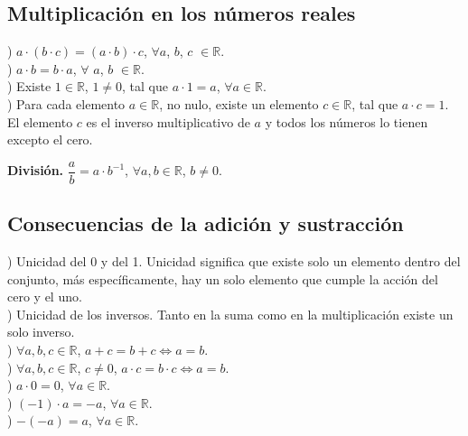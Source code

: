 \subsection{Multiplicación en los números reales}
) $a\cdot(b\cdot c)=(a\cdot b)\cdot c$, $\forall a$, $b$, $c$ $\in \mathbb{R}$.\\

) $a\cdot b=b\cdot a$, $\forall$ $a$, $b$ $\in\mathbb{R}$.\\

) Existe $1\in\mathbb{R}$, $1\neq 0$, tal que $a\cdot 1=a$, $\forall a\in\mathbb{R}$.\\

) Para cada elemento $a\in\mathbb{R}$, no nulo, existe un elemento $c\in\mathbb{R}$, tal que $a\cdot c=1$. El elemento $c$ es el inverso multiplicativo de $a$ y todos los números lo tienen excepto el cero.\\

\begin{mydef}
\textbf{División.} $\dfrac{a}{b}=a\cdot b^{-1}$, $\forall a,b\in\mathbb{R}$, $b\neq 0$.
\end{mydef}

\subsection{Consecuencias de la adición y sustracción}
\label{consecu}
) Unicidad del 0 y del 1. Unicidad significa que existe solo un elemento dentro del conjunto, más específicamente, hay un solo elemento que cumple la acción del cero y el uno. \\

) Unicidad de los inversos. Tanto en la suma como en la multiplicación existe un solo inverso.\\

) $\forall a,b,c\in\mathbb{R}$, $a+c=b+c\Leftrightarrow a=b$. \\

) $\forall a,b,c\in\mathbb{R}$, $c\neq 0$, $a\cdot c=b\cdot c\Leftrightarrow a=b$. \\

) $a\cdot 0=0$, $\forall a\in\mathbb{R}$. \\

) $(-1)\cdot a=-a$, $\forall a\in\mathbb{R}$. \\

) $-(-a)=a$, $\forall a\in\mathbb{R}$. \\

